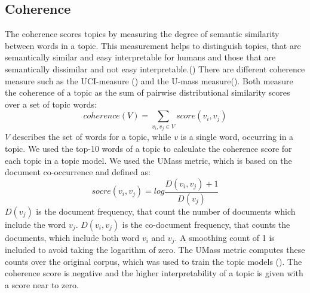 \subsection{Coherence}
The coherence scores topics by measuring the degree of semantic similarity between words in a topic. This measurement helps to distinguish topics, that are semantically similar and easy interpretable for humans and those that are semantically dissimilar and not easy interpretable.(\cite{Stevens2012}) There are different coherence measure such as the UCI-measure (\cite{Newman2010}) and the U-mass measure(\cite{Mimno2011}). Both measure the coherence of a topic as the sum of pairwise distributional similarity scores over a set of topic words:
\begin{equation}
coherence (V) = \sum_{v_{i},v_{j}\in V} score(v_{i},v_{j})
\end{equation}
$V$ describes the set of words for a topic, while $v$ is a single word, occurring in a topic. We used the top-10 words of a topic to calculate the coherence score for each topic in a topic model.
We used the UMass metric, which is based on the document co-occurrence and defined as: 
\begin{equation}
socre(v_{i},v_{j}) = log\frac{D(v_{i},v_{j})+1}{D(v_{j})}
\end{equation}
$D(v_{j})$ is the document frequency, that count the number of documents which include the word $v_{j}$. $D(v_{i},v_{j})$ is the co-document frequency, that counts the documents, which include both word $v_{i}$ and $v_{j}$. A smoothing count of 1 is included to avoid taking the logarithm of zero. The UMass metric computes these counts over the original corpus, which was used to train the topic models (\cite{Stevens2012}). The coherence score is negative and the higher interpretability of a topic is given with a score near to zero.

